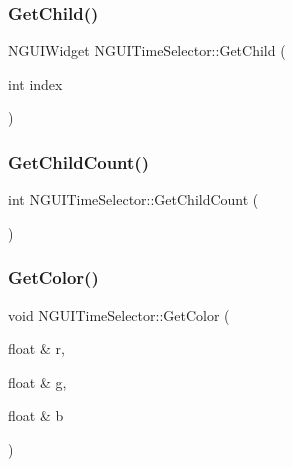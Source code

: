 \hypertarget{class_n_g_u_i_time_selector_ae8d21e3038d27a958265547e8934d50f}{}\label{class_n_g_u_i_time_selector_ae8d21e3038d27a958265547e8934d50f} 
\subsubsection{\texorpdfstring{Get\+Child()}{GetChild()}\hspace{0.1cm}{\footnotesize\ttfamily [2/2]}}
{\footnotesize\ttfamily N\+G\+U\+I\+Widget N\+G\+U\+I\+Time\+Selector\+::\+Get\+Child (\begin{DoxyParamCaption}\item[{int}]{index }\end{DoxyParamCaption})}

\hypertarget{class_n_g_u_i_time_selector_a7d67839013a0489f0e1a2957bc683ac0}{}\label{class_n_g_u_i_time_selector_a7d67839013a0489f0e1a2957bc683ac0} 
\subsubsection{\texorpdfstring{Get\+Child\+Count()}{GetChildCount()}}
{\footnotesize\ttfamily int N\+G\+U\+I\+Time\+Selector\+::\+Get\+Child\+Count (\begin{DoxyParamCaption}{ }\end{DoxyParamCaption})}

\hypertarget{class_n_g_u_i_time_selector_a3a284376e0dc768422ab1ab07af1a420}{}\label{class_n_g_u_i_time_selector_a3a284376e0dc768422ab1ab07af1a420} 
\subsubsection{\texorpdfstring{Get\+Color()}{GetColor()}}
{\footnotesize\ttfamily void N\+G\+U\+I\+Time\+Selector\+::\+Get\+Color (\begin{DoxyParamCaption}\item[{float \&}]{r,  }\item[{float \&}]{g,  }\item[{float \&}]{b }\end{DoxyParamCaption})}

